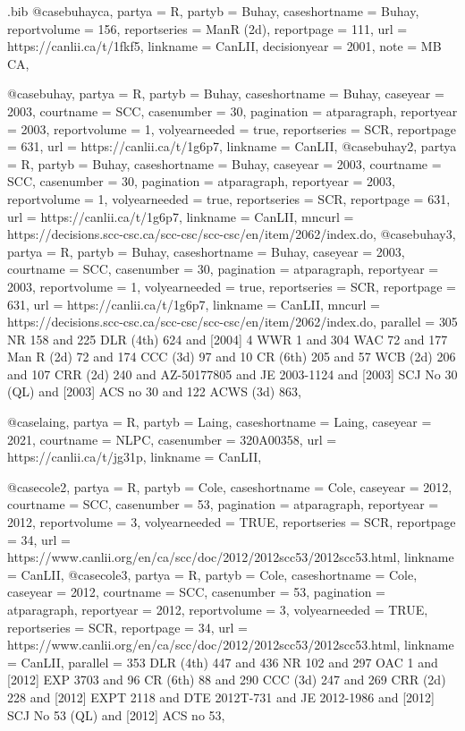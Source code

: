 \begin{filecontents*}[overwrite]{\jobname.bib}
@case{buhayca,	partya =  {R},	partyb =  {Buhay},	caseshortname =  {Buhay},						reportvolume =  {156},		reportseries =  {ManR (2d)},	reportpage =  {111},	url =  {https://canlii.ca/t/1fkf5},	linkname =  {CanLII},			decisionyear =  {2001},	note =  {MB CA},		}

@case{buhay,	partya =  {R},	partyb =  {Buhay},	caseshortname =  {Buhay},	caseyear =  {2003},	courtname =  {SCC},	casenumber =  {30},	pagination =  {atparagraph},	reportyear =  {2003},	reportvolume =  {1},	volyearneeded =  {true},	reportseries =  {SCR},	reportpage =  {631},	url =  {https://canlii.ca/t/1g6p7},	linkname =  {CanLII},				}
@case{buhay2,	partya =  {R},	partyb =  {Buhay},	caseshortname =  {Buhay},	caseyear =  {2003},	courtname =  {SCC},	casenumber =  {30},	pagination =  {atparagraph},	reportyear =  {2003},	reportvolume =  {1},	volyearneeded =  {true},	reportseries =  {SCR},	reportpage =  {631},	url =  {https://canlii.ca/t/1g6p7},	linkname =  {CanLII},	mncurl =  {https://decisions.scc-csc.ca/scc-csc/scc-csc/en/item/2062/index.do},			}
@case{buhay3,	partya =  {R},	partyb =  {Buhay},	caseshortname =  {Buhay},	caseyear =  {2003},	courtname =  {SCC},	casenumber =  {30},	pagination =  {atparagraph},	reportyear =  {2003},	reportvolume =  {1},	volyearneeded =  {true},	reportseries =  {SCR},	reportpage =  {631},	url =  {https://canlii.ca/t/1g6p7},	linkname =  {CanLII},	mncurl =  {https://decisions.scc-csc.ca/scc-csc/scc-csc/en/item/2062/index.do},	parallel =  {305 NR 158 and 225 DLR (4th) 624 and [2004] 4 WWR 1 and 304 WAC 72 and 177 Man R (2d) 72 and 174 CCC (3d) 97 and 10 CR (6th) 205 and 57 WCB (2d) 206 and 107 CRR (2d) 240 and AZ-50177805 and JE 2003-1124 and [2003] SCJ No 30 (QL) and [2003] ACS no 30 and 122 ACWS (3d) 863},		}


@case{laing,	partya =  {R},	partyb =  {Laing},	caseshortname =  {Laing},	caseyear =  {2021},	courtname =  {NLPC},	casenumber =  {320A00358},							url =  {https://canlii.ca/t/jg31p},	linkname =  {CanLII},				}



@case{cole2,	partya =  {R},	partyb =  {Cole},	caseshortname =  {Cole},	caseyear =  {2012},	courtname =  {SCC},	casenumber =  {53},	pagination =  {atparagraph},	reportyear =  {2012},	reportvolume =  {3},	volyearneeded =  {TRUE},	reportseries =  {SCR},	reportpage =  {34},	url =  {https://www.canlii.org/en/ca/scc/doc/2012/2012scc53/2012scc53.html},	linkname =  {CanLII},				}
@case{cole3,	partya =  {R},	partyb =  {Cole},	caseshortname =  {Cole},	caseyear =  {2012},	courtname =  {SCC},	casenumber =  {53},	pagination =  {atparagraph},	reportyear =  {2012},	reportvolume =  {3},	volyearneeded =  {TRUE},	reportseries =  {SCR},	reportpage =  {34},	url =  {https://www.canlii.org/en/ca/scc/doc/2012/2012scc53/2012scc53.html},	linkname =  {CanLII},		parallel =  {353 DLR (4th) 447 and 436 NR 102 and 297 OAC 1 and [2012] EXP 3703 and 96 CR (6th) 88 and 290 CCC (3d) 247 and 269 CRR (2d) 228 and [2012] EXPT 2118 and DTE 2012T-731 and JE 2012-1986 and [2012] SCJ No 53 (QL) and [2012] ACS no 53},		}


\end{filecontents*}
